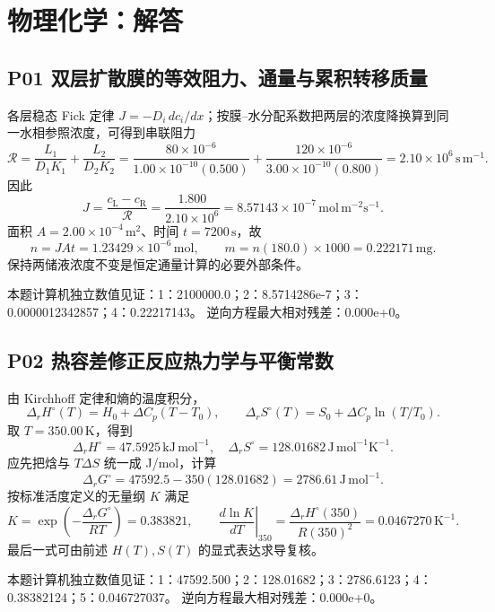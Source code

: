 \documentclass[UTF8,openany,11pt,a4paper]{ctexbook}
\begin{document}
\chapter{物理化学：解答}
\section{P01 \quad 双层扩散膜的等效阻力、通量与累积转移质量}
各层稳态 Fick 定律 \(J=-D_i\,dc_i/dx\)；按膜--水分配系数把两层的浓度降换算到同一水相参照浓度，可得到串联阻力
\[
\mathcal R=\frac{L_1}{D_1K_1}+\frac{L_2}{D_2K_2}
=\frac{80\times10^{-6}}{1.00\times10^{-10}(0.500)}
+\frac{120\times10^{-6}}{3.00\times10^{-10}(0.800)}
=2.10\times10^6\,\mathrm{s\,m^{-1}}.
\]
因此
\[
J=\frac{c_{\mathrm L}-c_{\mathrm R}}{\mathcal R}
=\frac{1.800}{2.10\times10^6}
=8.57143\times10^{-7}\,\mathrm{mol\,m^{-2}s^{-1}}.
\]
面积 \(A=2.00\times10^{-4}\,\mathrm{m^2}\)、时间 \(t=7200\,\mathrm s\)，故
\[
n=JAt=1.23429\times10^{-6}\,\mathrm{mol},\qquad
m=n(180.0)\times1000=0.222171\,\mathrm{mg}.
\]
保持两储液浓度不变是恒定通量计算的必要外部条件。
\begin{reviewnote}
本题计算机独立数值见证：1：2100000.0；2：8.5714286e-7；3：0.0000012342857；4：0.22217143。
逆向方程最大相对残差：0.000e+0。
\end{reviewnote}
\section{P02 \quad 热容差修正反应热力学与平衡常数}
由 Kirchhoff 定律和熵的温度积分，
\[
\Delta_rH^\circ(T)=H_0+\Delta C_p(T-T_0),\qquad
\Delta_rS^\circ(T)=S_0+\Delta C_p\ln(T/T_0).
\]
取 \(T=350.00\,\mathrm K\)，得到
\[
\Delta_rH^\circ=47.5925\,\mathrm{kJ\,mol^{-1}},
\quad
\Delta_rS^\circ=128.01682\,\mathrm{J\,mol^{-1}K^{-1}}.
\]
应先把焓与 \(T\Delta S\) 统一成 J/mol，计算
\[
\Delta_rG^\circ=47592.5-350(128.01682)
=2786.61\,\mathrm{J\,mol^{-1}}.
\]
按标准活度定义的无量纲 \(K\) 满足
\[
K=\exp\!\left(-\frac{\Delta_rG^\circ}{RT}\right)
=0.383821,\qquad
\left.\frac{d\ln K}{dT}\right|_{350}
=\frac{\Delta_rH^\circ(350)}{R(350)^2}
=0.0467270\,\mathrm{K^{-1}}.
\]
最后一式可由前述 \(H(T),S(T)\) 的显式表达求导复核。
\begin{reviewnote}
本题计算机独立数值见证：1：47592.500；2：128.01682；3：2786.6123；4：0.38382124；5：0.046727037。
逆向方程最大相对残差：0.000e+0。
\end{reviewnote}
\end{document}
